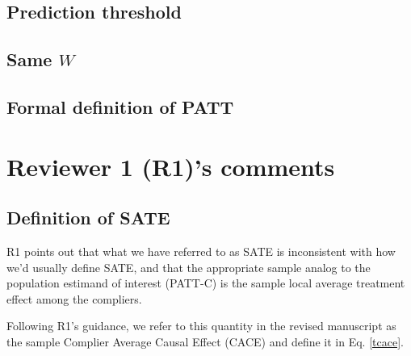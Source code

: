 \documentclass[hidelinks,12pt,letterpaper]{article}
\begin{document}
\subsection{Prediction threshold}

\subsection{Same $W$}

\subsection{Formal definition of PATT}

\section{Reviewer 1 (R1)'s comments}

\subsection{Definition of SATE} \label{SATE-def}

R1 points out that what we have referred to as SATE is inconsistent with how we'd usually define SATE, and that the appropriate sample analog to the population estimand of interest (PATT-C) is the sample local average treatment effect among the compliers.

Following R1's guidance, we refer to this quantity in the revised manuscript as the sample Complier Average Causal Effect (CACE) and define it in Eq. \ref{tcace}. 
\end{document}
